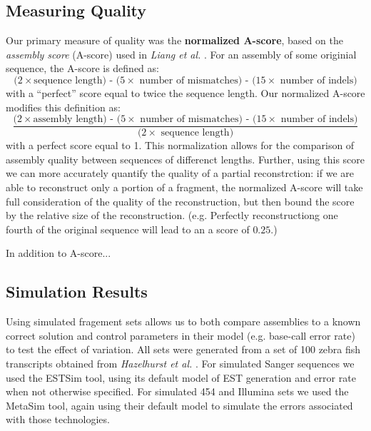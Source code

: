 \documentclass[10pt]{bmc_article}
\newcommand{\estsim}{{\small ESTSim}}
\newcommand{\metasim} {{\small MetaSim}}
\newenvironment{bmcformat}{\begin{raggedright}\baselineskip20pt\sloppy\setboolean{publ}{false}}{\end{raggedright}\baselineskip20pt\sloppy}
\begin{document}
\begin{bmcformat}
\subsection*{Measuring Quality}
Our primary measure of quality was the {\bf normalized A-score}, based
on the {\it assembly score} (A-score) used in {\it Liang et al.}
\cite{Liang00}.  For an assembly of some originial sequence, the
A-score is defined as:
$$\mbox{($2\times$sequence length) - ($5\times$ number of
mismatches) - ($15 \times$ number of indels)}$$
with a ``perfect'' score equal to twice the sequence length.  Our
normalized A-score modifies this definition as:
$$\frac{\mbox{($2\times$assembly length) - ($5\times$ number of mismatches)
  - ($15\times$ number of indels)}}{\mbox{($2\times$ sequence length)}}$$
with a perfect score equal to 1.  This normalization allows for the
comparison of assembly quality between sequences of differenct
lengths. Further, using this score we can more accurately quantify the
quality of a partial reconstrction: if we are able to reconstruct only
a portion of a fragment, the normalized A-score will take full
consideration of the quality of the reconstruction, but then bound the
score by the relative size of the reconstruction.  (e.g. Perfectly
reconstructiong one fourth of the original sequence will lead to an a
score of $0.25$.)  

In addition to A-score...

\subsection*{Simulation Results}
Using simulated fragement sets allows us to both compare assemblies to
a known correct solution and control parameters in their model
(e.g. base-call error rate) to test the effect of variation.  All sets
were generated from a set of 100 zebra fish transcripts obtained from
{\it Hazelhurst et al.}  \cite{Hazelhurst08}.  For simulated Sanger
sequences we used the \estsim\/ tool, using its default model of EST
generation and error rate when not otherwise specified.  For simulated
454 and Illumina sets we used the \metasim\/ tool, again using their
default model to simulate the errors associated with those
technologies.


\end{bmcformat}
\end{document}
